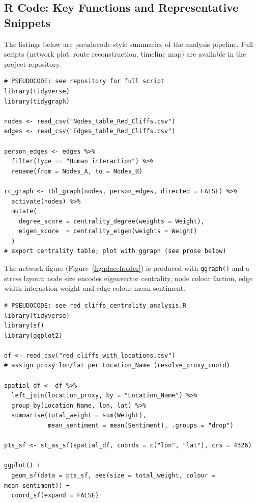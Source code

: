 \documentclass[12pt, a4paper]{article}
\begin{document}
\subsection{R Code: Key Functions and Representative Snippets}
\label{sec:code}

The listings below are pseudocode-style summaries of the analysis pipeline.
Full scripts (network plot, route reconstruction, timeline map) are available
in the project repository.

\begin{lstlisting}[caption={Network construction and centrality (\texttt{tidygraph});
                            abbreviated pipeline.},
                   label={lst:network_build}]
# PSEUDOCODE: see repository for full script
library(tidyverse)
library(tidygraph)

nodes <- read_csv("Nodes_table_Red_Cliffs.csv")
edges <- read_csv("Edges_table_Red_Cliffs.csv")

person_edges <- edges %>%
  filter(Type == "Human interaction") %>%
  rename(from = Nodes_A, to = Nodes_B)

rc_graph <- tbl_graph(nodes, person_edges, directed = FALSE) %>%
  activate(nodes) %>%
  mutate(
    degree_score = centrality_degree(weights = Weight),
    eigen_score  = centrality_eigen(weights = Weight)
  )
# export centrality table; plot with ggraph (see prose below)
\end{lstlisting}

The network figure (Figure~\ref{fig:placeholder}) is produced with
\texttt{ggraph()} and a stress layout: node size encodes eigenvector
centrality, node colour faction, edge width interaction weight and edge
colour mean sentiment.

\begin{lstlisting}[caption={Map 1: interaction map (\texttt{sf} / \texttt{ggplot2});
                            abbreviated pipeline.},
                   label={lst:spatial_interaction}]
# PSEUDOCODE: see red_cliffs_centrality_analysis.R
library(tidyverse)
library(sf)
library(ggplot2)

df <- read_csv("red_cliffs_with_locations.csv")
# assign proxy lon/lat per Location_Name (resolve_proxy_coord)

spatial_df <- df %>%
  left_join(location_proxy, by = "Location_Name") %>%
  group_by(Location_Name, lon, lat) %>%
  summarise(total_weight = sum(Weight),
            mean_sentiment = mean(Sentiment), .groups = "drop")

pts_sf <- st_as_sf(spatial_df, coords = c("lon", "lat"), crs = 4326)

ggplot() +
  geom_sf(data = pts_sf, aes(size = total_weight, colour = mean_sentiment)) +
  coord_sf(expand = FALSE)
\end{lstlisting}
\end{document}

